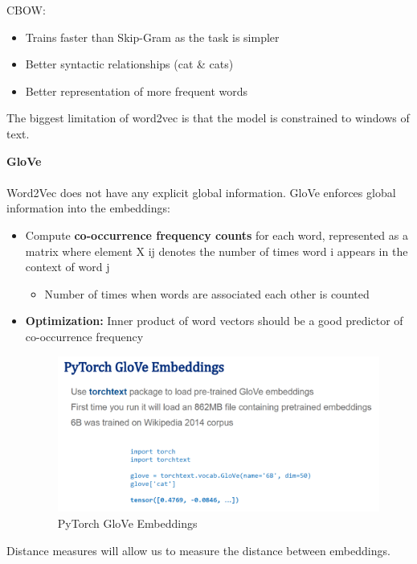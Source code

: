 CBOW:
\begin{itemize}
  \item Trains faster than Skip-Gram as the task is simpler
  \item Better syntactic relationships (cat \& cats)
  \item Better representation of more frequent words
\end{itemize}

\begin{idea}
    The biggest limitation of word2vec is that the model is constrained to windows of text.
\end{idea}

\newpage

\noindent \textbf{GloVe}\\

\\Word2Vec does not have any explicit global information. GloVe enforces global information into the embeddings:

\begin{itemize}
    \item Compute\textbf{ co-occurrence frequency counts }for each word, represented as a
matrix where element X ij denotes the number of times word i appears in
the context of word j
\begin{itemize}
    \item Number of times when words are associated each other is counted
\end{itemize}
\item \textbf{Optimization:} Inner product of word vectors should be a good predictor
of co-occurrence frequency

\begin{figure}[h!t]
    \centering
    \includegraphics[width=0.75\linewidth]{gloveembpy.png}
    \caption{PyTorch GloVe Embeddings}
    \label{fig:enter-label}
\end{figure}
\end{itemize}

Distance measures will allow us to measure the distance between embeddings.

